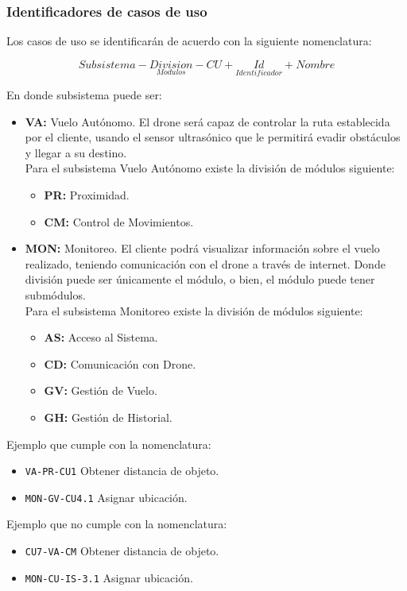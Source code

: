 %

\subsubsection{Identificadores de casos de uso} 

Los casos de uso se identificarán de acuerdo con la siguiente nomenclatura:

\begin{equation*}
Subsistema - \underset{Modulos}{Division} - CU + \underset{Identificador}{Id} + 
Nombre
\end{equation*}

En donde subsistema puede ser:
\begin{itemize}
	\item \textbf{VA:} Vuelo Autónomo. El drone será capaz de controlar la 
	ruta establecida por el cliente, usando el sensor ultrasónico que le 
	permitirá evadir obstáculos y llegar a su destino. \\
	Para el subsistema Vuelo Autónomo existe la división de módulos 
	siguiente:
	\begin{itemize}
		\item \textbf{PR:} Proximidad.
		\item \textbf{CM:} Control de Movimientos.
	\end{itemize}
	\item \textbf{MON:} Monitoreo. El cliente podrá visualizar información 
	sobre el vuelo realizado, teniendo comunicación con el drone a través de 
	internet. Donde división puede ser únicamente el módulo, o bien, el 
	módulo puede tener submódulos. \\
	Para el subsistema Monitoreo existe la división de módulos siguiente:
	\begin{itemize}
		\item \textbf{AS:} Acceso al Sistema.
		\item \textbf{CD:} Comunicación con Drone.
		\item \textbf{GV:} Gestión de Vuelo.
		\item \textbf{GH:} Gestión de Historial.
	\end{itemize}
\end{itemize}

Ejemplo que cumple con la nomenclatura:
\begin{itemize}
	\item \texttt{VA-PR-CU1} Obtener distancia de objeto.
	\item \texttt{MON-GV-CU4.1} Asignar ubicación.
\end{itemize}

Ejemplo que no cumple con la nomenclatura:
\begin{itemize}
	\item \texttt{CU7-VA-CM} Obtener distancia de objeto.
	\item \texttt{MON-CU-IS-3.1} Asignar ubicación.
\end{itemize}
